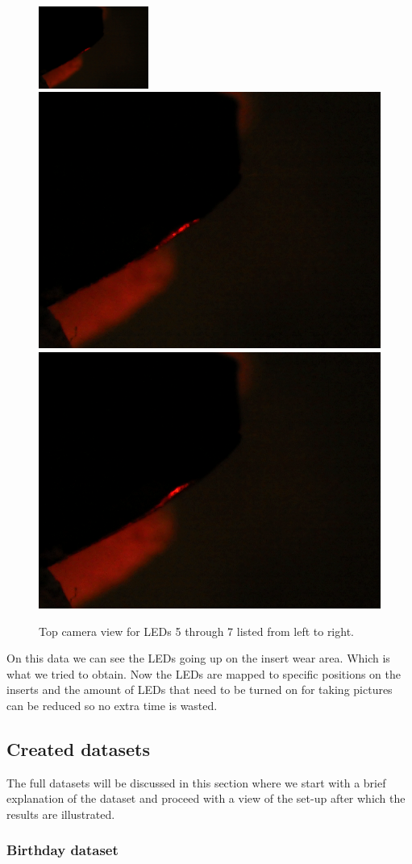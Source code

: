 \begin{figure}
\includegraphics[width=0.32\textwidth, keepaspectratio=true]{./fig/Vision/Dataset/automated_datasets/1_check_camera_position/2_camera_position_top/p3_l5.png}\hfill
\includegraphics[width=.32\textwidth, keepaspectratio=true]{./fig/Vision/Dataset/automated_datasets/1_check_camera_position/2_camera_position_top/p3_l6.png}\hfill
\includegraphics[width=.32\textwidth, keepaspectratio=true]{./fig/Vision/Dataset/automated_datasets/1_check_camera_position/2_camera_position_top/p3_l7.png}
\caption{Top camera view for LEDs 5 through 7 listed from left to right.}
\label{fig:dataset:cameraposition:top:results}
\end{figure}

On this data we can see the LEDs going up on the insert wear area. Which is what we tried to obtain. Now the LEDs are mapped to specific positions on the inserts and the amount of LEDs that need to be turned on for taking pictures can be reduced so no extra time is wasted. 

		\subsection{Created datasets}

The full datasets will be discussed in this section where we start with a brief explanation of the dataset and proceed with a view of the set-up after which the results are illustrated.

			\subsubsection{Birthday dataset}
			\label{sec:impl:dataset:birthday}
			
